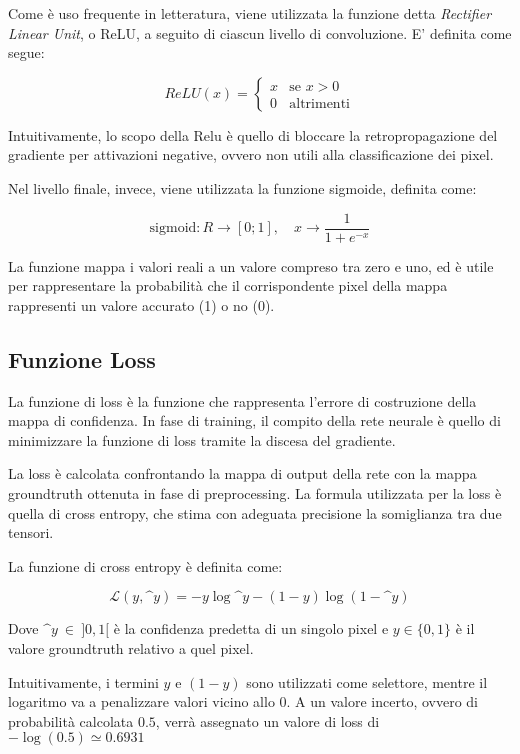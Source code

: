 \documentclass[12pt,a4paper]{report}
\begin{document}
Come è uso frequente in letteratura, viene utilizzata la funzione detta
\textit{Rectifier Linear Unit}, o ReLU, a seguito di ciascun livello di
convoluzione. E' definita come segue:

$$ ReLU(x) =
\begin{cases}
    x & \text{se } x > 0 \\
    0 & \text{altrimenti}
\end{cases}  $$

Intuitivamente, lo scopo della Relu è quello di bloccare la retropropagazione del 
gradiente per attivazioni negative, ovvero non utili alla classificazione dei
pixel.

Nel livello finale, invece, viene utilizzata la funzione sigmoide, definita come:

$$ \text{sigmoid}: R \rightarrow [0;1],\,\,\,\,\,\, x \rightarrow
\dfrac{1}{1+e^{-x}} $$

La funzione mappa i valori reali a un valore compreso tra zero e uno, ed è utile
per rappresentare la probabilità che il corrispondente pixel della mappa
rappresenti un valore accurato (1) o no (0).

\subsection{Funzione Loss}

La funzione di loss è la funzione che rappresenta l'errore di costruzione
della mappa di confidenza. 
In fase di training, il compito della rete neurale è quello di minimizzare la 
funzione di loss tramite la discesa del gradiente.

La loss è calcolata confrontando la mappa di output della rete con la mappa 
groundtruth ottenuta in fase di preprocessing.
La formula utilizzata per la loss è quella di cross entropy, che stima con
adeguata precisione la somiglianza tra due tensori.

La funzione di cross entropy è definita come:

$$ \mathcal{L}(y, \^y) = -y \log \^y - (1-y)\log(1-\^y) $$

Dove $\^y \ \in \ ]0,1[$ è la confidenza predetta di un singolo pixel e
$y \in \{0,1\} $ è il valore groundtruth relativo a quel pixel.

Intuitivamente, i termini $y$ e $(1-y)$ sono utilizzati come selettore, mentre 
il logaritmo va a penalizzare valori vicino allo 0. A un valore incerto, ovvero
di probabilità calcolata $0.5$, verrà assegnato un valore di loss di
$-\log(0.5) \simeq 0.6931$
\end{document}
